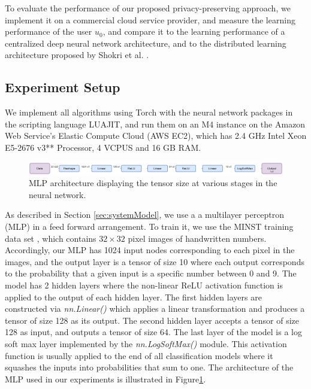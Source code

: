 \documentclass[conference]{IEEEtran}
\begin{document}
To evaluate the performance of our proposed privacy-preserving approach, we implement it on a commercial cloud service provider, and
measure the learning performance of the user $u_0$, and compare it to the learning performance of a centralized deep neural network
architecture, and to the distributed learning architecture proposed by Shokri et al. \cite{shokri2015privacy}. 

\subsection{Experiment Setup}
We implement all algorithms using Torch with the neural network packages in the scripting language LUAJIT, and run them on an M4
instance on the Amazon Web Service's Elastic Compute Cloud (AWS EC2), which has
2.4 GHz Intel Xeon E5-2676 v3** Processor, 4 VCPUS and 16 GB RAM.
\begin{figure}[t]
\centering
\includegraphics[width = 2 \columnwidth, keepaspectratio]{MLPArchitecture}
\caption{MLP architecture displaying the tensor size at various stages in the neural network. }
\label{fig:MLPArch}
\end{figure}
As described in Section \ref{sec:systemModel}, we use a 
a multilayer perceptron (MLP) in a feed forward arrangement. To train it, we use the MINST training data set \cite{deng2012mnist}, which contains 
$32\times 32$ pixel images of handwritten numbers. Accordingly, our MLP has 1024 input nodes
corresponding to each pixel in the images, and the output layer is a tensor of size 10 where each output corresponds to the probability
that a given input is a specific number
between 0 and 9.  The model has 2 hidden layers where the non-linear ReLU activation function is applied to the
output of each hidden layer.  The first hidden layers are constructed via \textit{nn.Linear()} which applies a linear transformation
and produces a tensor of size 128 as its output. The second hidden layer accepts a tensor of size 128 as input, and outputs a tensor of
size 64. The last layer of the model is a log soft max layer implemented by the \textit{nn.LogSoftMax()} module.  This activation
function is usually applied to the end of all classification models where it squashes the inputs into probabilities that sum to one.
The architecture of the MLP used in our experiments is illustrated in Figure\ref{fig:MLPArch}.
\end{document}
